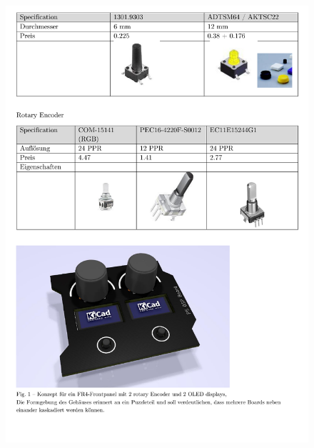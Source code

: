 \begin{appendix}
\begin{figure}[h]
	\centering
	\includegraphics[width=0.95\linewidth]{appendix/pflichtenheft (5).pdf}
\end{figure}


\end{appendix}
